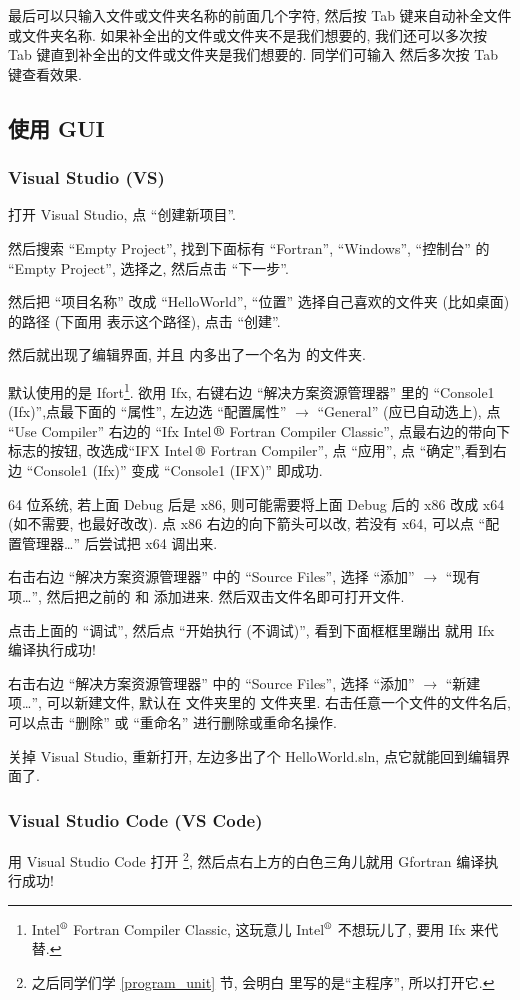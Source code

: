 最后可以只输入文件或文件夹名称的前面几个字符, 然后按 Tab 键来自动补全文件或文件夹名称. 如果补全出的文件或文件夹不是我们想要的, 我们还可以多次按 Tab 键直到补全出的文件或文件夹是我们想要的. 同学们可输入  然后多次按 Tab 键查看效果. 

\subsection{使用 GUI}

\subsubsection{Visual Studio (VS)}

打开 Visual Studio, 点 ``创建新项目''.

然后搜索 ``Empty Project'', 找到下面标有 ``Fortran'', ``Windows'', ``控制台'' 的 ``Empty Project'', 选择之, 然后点击 ``下一步''.

然后把 ``项目名称'' 改成 ``HelloWorld'', ``位置'' 选择自己喜欢的文件夹 (比如桌面) 的路径 (下面用 \ttt{[dir]} 表示这个路径), 点击 ``创建''.

然后就出现了编辑界面, 并且 \ttt{[dir]} 内多出了一个名为  的文件夹.

默认使用的是 Ifort\footnote{Intel${}^\r$ Fortran Compiler Classic, 这玩意儿 Intel${}^\r$ 不想玩儿了, 要用 Ifx 来代替.}. 欲用 Ifx, 右键右边 ``解决方案资源管理器'' 里的 ``Console1 (Ifx)'',点最下面的 ``属性'', 左边选 ``配置属性'' $\rightarrow$ ``General'' (应已自动选上), 点 ``Use Compiler'' 右边的 ``Ifx Intel$\,\r$ Fortran Compiler Classic'', 点最右边的带向下标志的按钮, 改选成``IFX Intel$\,\r$ Fortran Compiler'', 点 ``应用'', 点 ``确定'',看到右边 ``Console1 (Ifx)'' 变成 ``Console1 (IFX)'' 即成功.

64 位系统, 若上面 Debug 后是 x86, 则可能需要将上面 Debug 后的 x86 改成 x64 (如不需要, 也最好改改). 点 x86 右边的向下箭头可以改, 若没有 x64, 可以点 ``配置管理器\dots{}'' 后尝试把 x64 调出来.

右击右边 ``解决方案资源管理器'' 中的 ``Source Files'', 选择 ``添加'' $\rightarrow$ ``现有项\dots{}'', 然后把之前的  和  添加进来. 然后双击文件名即可打开文件.

点击上面的 ``调试'', 然后点 ``开始执行 (不调试)'', 看到下面框框里蹦出  就用 Ifx 编译执行成功!

右击右边 ``解决方案资源管理器'' 中的 ``Source Files'', 选择 ``添加'' $\rightarrow$ ``新建项\dots{}'', 可以新建文件, 默认在  文件夹里的  文件夹里. 右击任意一个文件的文件名后, 可以点击 ``删除'' 或 ``重命名'' 进行删除或重命名操作.

关掉 Visual Studio, 重新打开, 左边多出了个 HelloWorld.sln, 点它就能回到编辑界面了.

\subsubsection{Visual Studio Code (VS Code)}

用 Visual Studio Code 打开 \footnote{之后同学们学 \ref{program_unit} 节, 会明白  里写的是``主程序'', 所以打开它.}, 然后点右上方的白色三角儿就用 Gfortran 编译执行成功!
